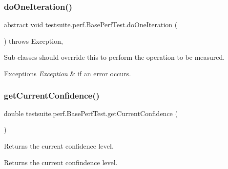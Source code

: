 \subsubsection{\texorpdfstring{do\+One\+Iteration()}{doOneIteration()}}
{\footnotesize\ttfamily abstract void testsuite.\+perf.\+Base\+Perf\+Test.\+do\+One\+Iteration (\begin{DoxyParamCaption}{ }\end{DoxyParamCaption}) throws Exception\hspace{0.3cm}{\ttfamily [abstract]}, {\ttfamily [protected]}}

Sub-\/classes should override this to perform the operation to be measured.


\begin{DoxyExceptions}{Exceptions}
{\em Exception} & if an error occurs. \\
\hline
\end{DoxyExceptions}
\mbox{\label{classtestsuite_1_1perf_1_1_base_perf_test_aafbdf56943e217d90ffd87d17c118af1}} 
\subsubsection{\texorpdfstring{get\+Current\+Confidence()}{getCurrentConfidence()}}
{\footnotesize\ttfamily double testsuite.\+perf.\+Base\+Perf\+Test.\+get\+Current\+Confidence (\begin{DoxyParamCaption}{ }\end{DoxyParamCaption})\hspace{0.3cm}{\ttfamily [protected]}}

Returns the current confidence level.

\begin{DoxyReturn}{Returns}
the current confindence level. 
\end{DoxyReturn}
\mbox{\label{classtestsuite_1_1perf_1_1_base_perf_test_a9206b0e839cce6e668eec8c2cd94bc5c}} 
